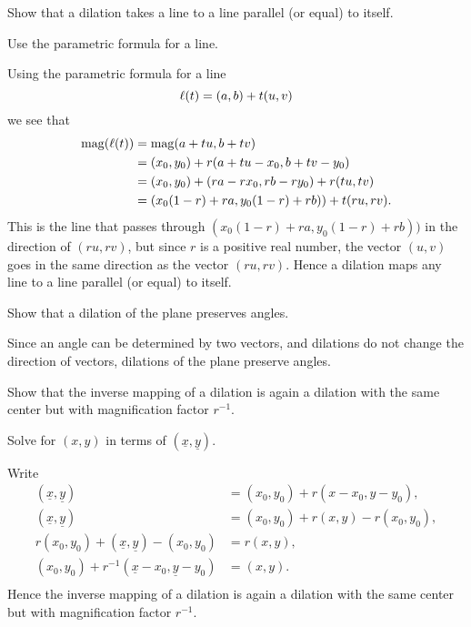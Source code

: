 \documentclass[newpage,hints,handout,12pt,noauthor,nooutcomes]{ximera}
\begin{document}
\begin{problem}
Show that a dilation takes a line to a line parallel (or equal) to
itself.
\begin{hint}
Use the parametric formula for a line.
\end{hint}
\begin{freeResponse}
Using the parametric formula for a line
\[
\ell(t) = (a,b) + t(u,v)
\]
we see that
\begin{align*}
\mathrm{mag}(\ell(t)) &=\mathrm{mag}(a+tu,b+tv)\\
&= (x_0,y_0) + r(a+tu-x_0,b+tv-y_0)\\
&= (x_0,y_0) + (ra - rx_0,rb-ry_0)+ r(tu,tv)\\
&= (x_0(1-r) + ra,y_0(1-r)+rb)) + t(ru,rv). 
\end{align*}
This is the line that passes through $(x_0(1-r) + ra,y_0(1-r)+rb))$ in
the direction of $(ru,rv)$, but since $r$ is a positive real number,
the vector $(u,v)$ goes in the same direction as the vector
$(ru,rv)$. Hence a dilation maps any line to a line parallel (or
equal) to itself.
\end{freeResponse}
\end{problem}

\begin{problem}
Show that a dilation of the plane preserves angles.
\begin{freeResponse}
Since an angle can be determined by two vectors, and dilations do not
change the direction of vectors, dilations of the plane preserve
angles.
\end{freeResponse}
\end{problem}


\begin{problem}
Show that the inverse mapping of a dilation is again a dilation with
the same center but with magnification factor $r^{-1}$.
\begin{hint}
Solve for $(x,y)$ in terms of $(\underline{x},\underline{y})$.
\end{hint}
\begin{freeResponse}
Write
\begin{align*}
(\underline{x},\underline{y}) &= (x_{0},y_{0})  +r(x-x_{0},y-y_{0}), \\
(\underline{x},\underline{y}) &= (x_{0},y_{0})  +r(x,y) -r(x_{0},y_{0}), \\
r(x_0,y_0) + (\underline{x},\underline{y}) - (x_0,y_0) &= r(x,y), \\
(x_0,y_0) + r^{-1}(\underline{x}-x_0,\underline{y}-y_0) &= (x,y). \\
\end{align*}
Hence the inverse mapping of a dilation is again a dilation with the
same center but with magnification factor $r^{-1}$.
\end{freeResponse}
\end{problem}
\end{document}
